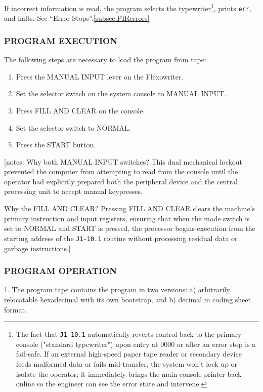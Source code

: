 \documentclass{article}
\begin{document}
\begin{enumerate}
If incorrect information is read, the program selects the typewriter\footnote{The fact that \texttt{J1-10.1} automatically reverts control back to the primary console ("standard typewriter") upon entry at $0000$ or after an error stop is a fail-safe. If an external high-speed paper tape reader or secondary device feeds malformed data or fails mid-transfer, the system won't lock up or isolate the operator; it immediately brings the main console printer back online so the engineer can see the error state and intervene.}, prints \texttt{err}, and halts. See ``Error Stops''.\ref{subsec:PIRerrors}

\subsubsection*{PROGRAM EXECUTION}
The following steps are necessary to load the program from tape:
\begin{enumerate}
  \item Press the \textsf{MANUAL INPUT} lever on the Flexowriter.
  \item Set the selector switch on the system console to \textsf{MANUAL INPUT}.
  \item Press \textsf{FILL AND CLEAR} on the console.
  \item Set the selector switch to \textsf{NORMAL}.
  \item Press the \textsf{START} button.
\end{enumerate}

[notes: Why both \textsf{MANUAL INPUT} switches? This dual mechanical lockout prevented the computer from attempting to read from the console until the operator had explicitly prepared both the peripheral device and the central processing unit to accept manual keypresses.

Why the \textsf{FILL AND CLEAR}? Pressing \textsf{FILL AND CLEAR} clears the machine's primary instruction and input registers, ensuring that when the mode switch is set to \textsf{NORMAL} and \textsf{START} is pressed, the processor begins execution from the starting address of the \texttt{J1-10.1} routine without processing residual data or garbage instructions.]

\subsubsection*{PROGRAM OPERATION}

1. The program tape contains the program in two versions: a) arbitrarily relocatable hexadecimal with its own bootstrap, and b) decimal in coding sheet format.


\end{enumerate}
\end{document}
